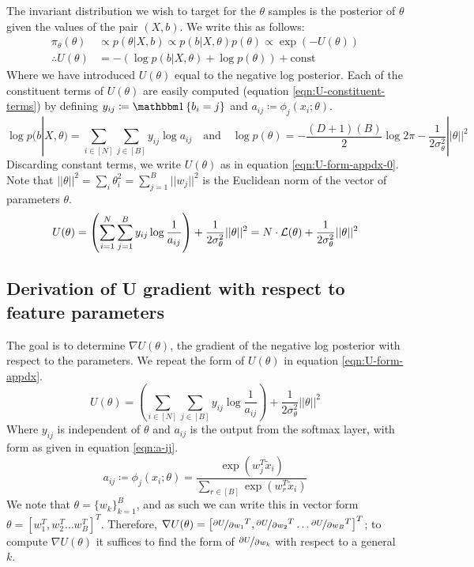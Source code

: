 The invariant distribution we wish to target for the $\theta$ samples is the posterior of $\theta$ given the values of the pair $(X, b)$. We write this as follows:
%
\begin{align}
	\pi_\theta(\theta) &\propto p(\theta | X, b) \propto p(b | X, \theta) p(\theta) \propto  \exp \left( - U(\theta) \right) \\
	\therefore U(\theta) &= - \left( \log p(b | X, \theta) + \log p(\theta) \right) + \textrm{const}
\end{align}
%
Where we have introduced $U(\theta)$ equal to the negative log posterior. Each of the constituent terms of $U(\theta)$ are easily computed (equation \ref{eqn:U-constituent-terms}) by defining $y_{ij} \coloneqq \one \left\{ b_i = j \right\}$ and $a_{ij} \coloneqq \phi_j(x_i; \theta)$.
%
\begin{equation}
	\log p(b | X, \theta) = \sum_{i \in [N]} \sum_{j \in [B]} y_{ij} \log a_{ij}  \quad \textrm{and} \quad
	\log p(\theta) = -\frac{(D+1)(B)}{2} \log 2\pi - \frac{1}{2 \sigma_\theta^2} || \theta ||^2
	\label{eqn:U-constituent-terms}
\end{equation}
%
Discarding constant terms, we write $U(\theta)$ as in equation \ref{eqn:U-form-appdx-0}. Note that $||\theta||^2 = \sum_{i} \theta_{i}^2 = \sum_{j=1}^{B} ||w_j||^2$ is the Euclidean norm of the vector of parameters $\theta$.
%
\begin{equation}
	U(\theta) = \left( \sum_{i=1}^{N} \sum_{j=1}^{B} y_{ij} \log \frac{1}{a_{ij}} \right)
	+ \frac{1}{2\sigma_\theta^2} ||\theta||^2 = N \cdot \mathcal{L}(\theta) + \frac{1}{2\sigma_\theta^2} ||\theta||^2
	\label{eqn:U-form-appdx-0}
\end{equation}
%

\subsection{Derivation of U gradient with respect to feature parameters}
\label{appdx:gradu}
The goal is to determine $\nabla U(\theta)$, the gradient of the negative log posterior with respect to the parameters. We repeat the form of $U(\theta)$ in equation \ref{eqn:U-form-appdx}.
%
\begin{equation}
	U(\theta) = \left( \sum_{i \in [N]} \sum_{j \in [B]} y_{ij} \log \frac{1}{a_{ij}} \right)
	+ \frac{1}{2\sigma_\theta^2} ||\theta||^2
	\label{eqn:U-form-appdx}
\end{equation}
%
Where $y_{ij}$ is independent of $\theta$ and $a_{ij}$ is the output from the softmax layer, with form as given in equation \ref{eqn:a-ij}.
%
\begin{equation}
	a_{ij} \coloneqq \phi_{j} (x_i; \theta) = \frac{\exp(w_j^T \tilde{x}_i)}{\sum_{r \in [B]} \exp(w_r^T \tilde{x}_i)}
	\label{eqn:a-ij} 
\end{equation}
%
We note that $\theta = \{w_k\}_{k=1}^B$, and as such we can write this in vector form $\theta = \left[w_1^T, w_2^T \dots w_B^T  \right]^T$. Therefore, $\nabla U(\theta) = \left[\nicefrac{\partial U}{\partial w_1}^T,\nicefrac{\partial U}{\partial w_2}^T \dots \nicefrac{\partial U}{\partial w_B}^T  \right]^T$; to compute $\nabla U(\theta)$ it suffices to find the form of $\nicefrac{\partial U}{\partial w_k}$ with respect to a general $k$.

